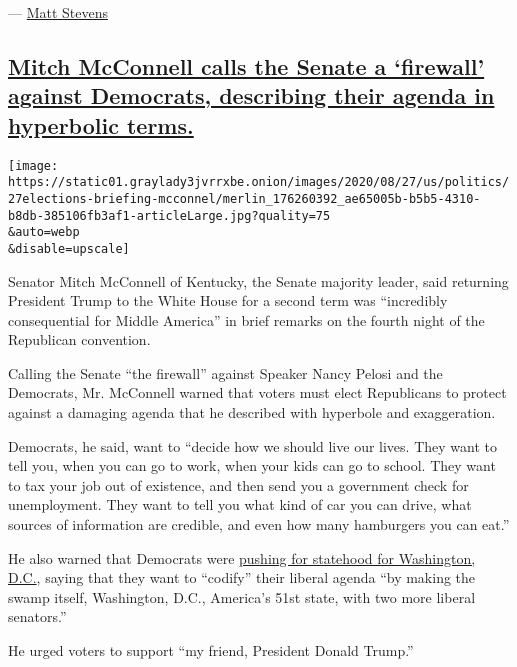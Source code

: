 --- \href{https://www.nytimes3xbfgragh.onion/by/matt-stevens}{Matt
Stevens}

\hypertarget{mitch-mcconnell-calls-the-senate-a-firewall-against-democrats-describing-their-agenda-in-hyperbolic-terms}{%
\subsection{\texorpdfstring{\protect\hyperlink{mitch-mcconnell-calls-the-senate-a-firewall-against-democrats-describing-their-agenda-in-hyperbolic-terms}{Mitch
McConnell calls the Senate a `firewall' against Democrats, describing
their agenda in hyperbolic
terms.}}{Mitch McConnell calls the Senate a `firewall' against Democrats, describing their agenda in hyperbolic terms.}}\label{mitch-mcconnell-calls-the-senate-a-firewall-against-democrats-describing-their-agenda-in-hyperbolic-terms}}

\texttt{[image: https://static01.graylady3jvrrxbe.onion/images/2020/08/27/us/politics/27elections-briefing-mcconnel/merlin\_176260392\_ae65005b-b5b5-4310-b8db-385106fb3af1-articleLarge.jpg?quality=75\\\&auto=webp\\\&disable=upscale]}

Senator Mitch McConnell of Kentucky, the Senate majority leader, said
returning President Trump to the White House for a second term was
``incredibly consequential for Middle America'' in brief remarks on the
fourth night of the Republican convention.

Calling the Senate ``the firewall'' against Speaker Nancy Pelosi and the
Democrats, Mr. McConnell warned that voters must elect Republicans to
protect against a damaging agenda that he described with hyperbole and
exaggeration.

Democrats, he said, want to ``decide how we should live our lives. They
want to tell you, when you can go to work, when your kids can go to
school. They want to tax your job out of existence, and then send you a
government check for unemployment. They want to tell you what kind of
car you can drive, what sources of information are credible, and even
how many hamburgers you can eat.''

He also warned that Democrats were
\href{https://www.nytimes3xbfgragh.onion/2020/06/26/us/politics/dc-statehood-house-vote.html}{pushing
for statehood for Washington, D.C.}, saying that they want to ``codify''
their liberal agenda ``by making the swamp itself, Washington, D.C.,
America's 51st state, with two more liberal senators.''

He urged voters to support ``my friend, President Donald Trump.''

